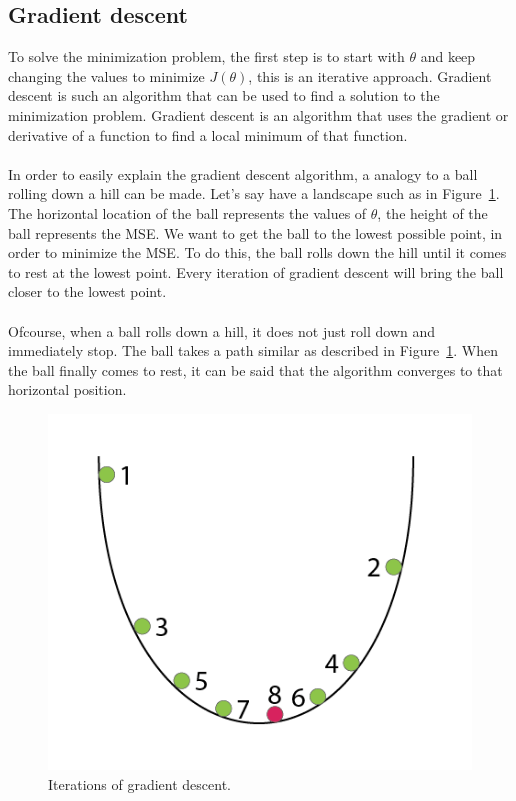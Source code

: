 \subsection{Gradient descent}
To solve the minimization problem, the first step is to start with $\theta$ and keep changing the values to minimize $J(\theta)$, this is an iterative approach.  Gradient descent is such an algorithm that can be used to find a solution to the minimization problem. Gradient descent is an algorithm that uses the gradient or derivative of a function to find a local minimum of that function. \\\\
In order to easily explain the gradient descent algorithm, a analogy to a ball rolling down a hill can be made. Let's say have a landscape such as in Figure~\ref{fig:gradient}. The horizontal location of the ball represents the values of $\theta$, the height of the ball represents the MSE. We want to get the ball to the lowest possible point, in order to minimize the MSE. To do this, the ball rolls down the hill until it comes to rest at the lowest point. Every iteration of gradient descent will bring the ball closer to the lowest point. \cite{rollingBall}\\\\
Ofcourse, when a ball rolls down a hill, it does not just roll down and immediately stop. The ball takes a path similar as described in Figure~\ref{fig:gradient}. When the ball finally comes to rest, it can be said that the algorithm converges to that horizontal position.
 \begin{figure}[H]
\centering
\includegraphics[width=1\textwidth]{Figures/gradient}
\decoRule
\caption[Gradient descent]{Iterations of gradient descent. \cite{gradient-fig}}
\label{fig:gradient}
\end{figure}
